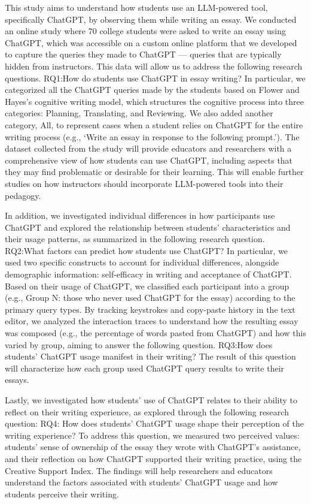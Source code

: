 \documentclass[manuscript,screen,acmsmall]{acmart}
\begin{document}
This study aims to understand how students use an LLM-powered tool, specifically ChatGPT, by observing them while writing an essay. We conducted an online study where 70 college students were asked to write an essay using ChatGPT, which was accessible on a custom online platform that we developed to capture the queries they made to ChatGPT --- queries that are typically hidden from instructors. This data will allow us to address the following research questions. 
RQ1:How do students use ChatGPT in essay writing? 
In particular, we categorized all the ChatGPT queries made by the students based on Flower and Hayes's cognitive writing model, which structures the cognitive process into three categories: Planning, Translating, and Reviewing. We also added another category, All, to represent cases when a student relies on ChatGPT for the entire writing process (e.g., `Write an essay in response to the following prompt.'). The dataset collected from the study will provide educators and researchers with a comprehensive view of how students can use ChatGPT, including aspects that they may find problematic or desirable for their learning. This will enable further studies on how instructors should incorporate LLM-powered tools into their pedagogy. 

In addition, we investigated individual differences in how participants use ChatGPT and explored the relationship between students' characteristics and their usage patterns, as summarized in the following research question. 
RQ2:What factors can predict how students use ChatGPT? 
In particular, we used two specific constructs to account for individual differences, alongside demographic information: self-efficacy in writing and acceptance of ChatGPT. 
Based on their usage of ChatGPT, we classified each participant into a group (e.g., Group N: those who never used ChatGPT for the essay) according to the primary query types. By tracking keystrokes and copy-paste history in the text editor, we analyzed the interaction traces to understand how the resulting essay was composed (e.g., the percentage of words pasted from ChatGPT) and how this varied by group, aiming to answer the following question.
RQ3:How does students' ChatGPT usage manifest in their writing?
The result of this question will characterize how each group used ChatGPT query results to write their essays.

Lastly, we investigated how students' use of ChatGPT relates to their ability to reflect on their writing experience, as explored through the following research question: 
RQ4: How does students' ChatGPT usage shape their perception of the writing experience?
To address this question, we measured two perceived values: students' sense of ownership of the essay they wrote with ChatGPT's assistance,  and their reflection on how ChatGPT supported their writing practice, using the Creative Support Index.
The findings will help researchers and educators understand the factors associated with students' ChatGPT usage and how students perceive their writing.
\end{document}
